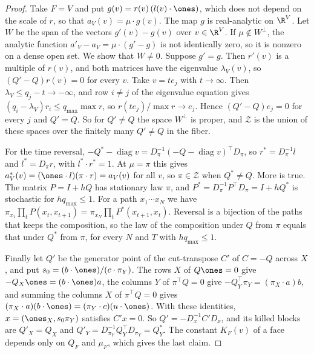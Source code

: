 \begin{proof}
Take $F=V$ and put $g(v)=r(v)\,(l(v)\cdot\ones)$, which does not depend on the
scale of $r$, so that $a_V(v)=\mu\cdot g(v)$. The map $g$ is real-analytic on
$\R^V$. Let $W$ be the span of the vectors $g'(v)-g(v)$ over $v\in\R^V$. If
$\mu\notin W^\perp$, the analytic function $a'_V-a_V=\mu\cdot(g'-g)$ is not
identically zero, so it is nonzero on a dense open set. We show that $W\ne0$.
Suppose $g'=g$. Then $r'(v)$ is a multiple of $r(v)$, and both matrices have the
eigenvalue $\lambda_V(v)$, so $(Q'-Q)r(v)=0$ for every $v$. Take $v=te_j$ with
$t\to\infty$. Then $\lambda_V\le q_j-t\to-\infty$, and row $i\ne j$ of the
eigenvalue equation gives $(q_i-\lambda_V)r_i\le q_{\max}\max r$, so
$r(te_j)/\max r\to e_j$. Hence $(Q'-Q)e_j=0$ for every $j$ and $Q'=Q$. So for
$Q'\ne Q$ the space $W^\perp$ is proper, and $\mathcal Z$ is the union of these
spaces over the finitely many $Q'\ne Q$ in the fiber.

For the time reversal, $-Q^*-\operatorname{diag}v=D_\pi^{-1}(-Q-\operatorname{diag}v)^\top
D_\pi$, so $r^*=D_\pi^{-1}l$ and $l^*=D_\pi r$, with $l^*\cdot r^*=1$. At
$\mu=\pi$ this gives $a^*_V(v)=(\ones\cdot l)(\pi\cdot r)=a_V(v)$ for all $v$, so
$\pi\in\mathcal Z$ when $Q^*\ne Q$. More is true. The matrix $P=I+hQ$ has
stationary law $\pi$, and $P^*=D_\pi^{-1}P^\top D_\pi=I+hQ^*$ is stochastic for
$hq_{\max}\le1$. For a path $x_1\cdots x_N$ we have
$\pi_{x_1}\prod_tP(x_t,x_{t+1})=\pi_{x_N}\prod_tP^*(x_{t+1},x_t)$. Reversal is a
bijection of the paths that keeps the composition, so the law of the composition
under $Q$ from $\pi$ equals that under $Q^*$ from $\pi$, for every $N$ and $T$
with $hq_{\max}\le1$.

Finally let $Q'$ be the generator point of the cut-transpose $C'$ of $C=-Q$ across
$X$, and put $s_0=(b\cdot\ones)/(c\cdot\pi_Y)$. The rows $X$ of $Q\ones=0$ give
$-Q_X\ones=(b\cdot\ones)a$, the columns $Y$ of $\pi^\top Q=0$ give
$-Q_Y^\top\pi_Y=(\pi_X\cdot a)b$, and summing the columns $X$ of $\pi^\top Q=0$
gives $(\pi_X\cdot a)(b\cdot\ones)=(\pi_Y\cdot c)(u\cdot\ones)$. With these
identities, $x=(\ones_X,s_0\pi_Y)$ satisfies $C'x=0$. So
$Q'=-D_x^{-1}C'D_x$, and its killed blocks are $Q'_X=Q_X$ and
$Q'_Y=D_{\pi_Y}^{-1}Q_Y^\top D_{\pi_Y}=Q^*_Y$. The constant $K_F(v)$ of a face
depends only on $Q_F$ and $\mu_F$, which gives the last claim.
\end{proof}

